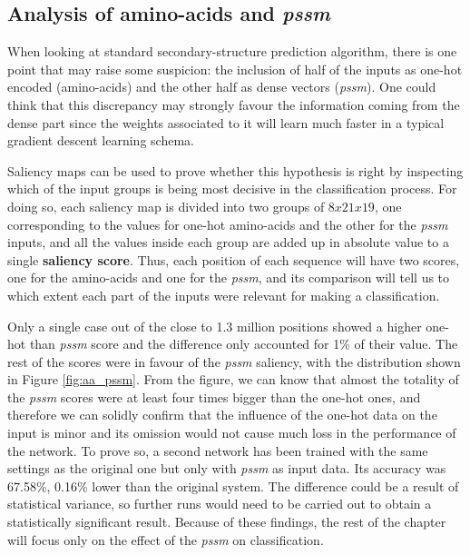 
\subsection{Analysis of amino-acids and \textit{pssm}}
When looking at standard secondary-structure prediction algorithm, there is one point that may raise some suspicion: the inclusion of half of the inputs as one-hot encoded (amino-acids) and the other half as dense vectors (\textit{pssm}). One could think that this discrepancy may strongly favour the information coming from the dense part since the weights associated to it will learn much faster in a typical gradient descent learning schema.

Saliency maps can be used to prove whether this hypothesis is right by inspecting which of the input groups is being most decisive in the classification process. For doing so, each saliency map is divided into two groups of $8x21x19$, one corresponding to the values for one-hot amino-acids and the other for the \textit{pssm} inputs, and all the values inside each group are added up in absolute value to a single \textbf{saliency score}. Thus, each position of each sequence will have two scores, one for the amino-acids and one for the \textit{pssm}, and its comparison will tell us to which extent each part of the inputs were relevant for making a classification.

Only a single case out of the close to 1.3 million positions showed a higher one-hot than \textit{pssm} score and the difference only accounted for 1\% of their value. The rest of the scores were in favour of the \textit{pssm} saliency, with the distribution shown in Figure \ref{fig:aa_pssm}. From the figure, we can know that almost the totality of the \textit{pssm} scores were at least four times bigger than the one-hot ones, and therefore we can solidly confirm that the influence of the one-hot data on the input is minor and its omission would not cause much loss in the performance of the network. To prove so, a second network has been trained with the same settings as the original one but only with \textit{pssm} as input data. Its accuracy was 67.58\%, 0.16\% lower than the original system. The difference could be a result of statistical variance, so further runs would need to be carried out to obtain a statistically significant result. Because of these findings, the rest of the chapter will focus only on the effect of the \textit{pssm} on classification.

